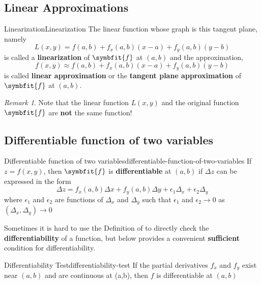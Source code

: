 \documentclass[math,code]{amznotes}
\theoremstyle{remark}
\newtheorem*{remark}{Remark}
\begin{document}
\subsection{Linear Approximations}
\begin{dfnbox}{Linearization}{Linearization}
    The linear function whose graph is this tangent plane, namely
    \begin{displaymath}
        L(x,y)=f(a,b)+f_x(a,b)(x-a)+f_y(a,b)(y-b)
    \end{displaymath}
    is called a {\color{red} \textbf{linearization}} of $\symbfit{f}$ at $(a,b)$ and the approximation,
    \begin{displaymath}
        f(x,y) \approx f(a,b)+f_x(a,b)(x-a)+f_y(a,b)(y-b)
    \end{displaymath}
    is called {\color{red} \textbf{linear approximation}} or the {\color{red} \textbf{tangent plane approximation}} of $\symbfit{f}$ at $(a,b)$.
\end{dfnbox}
\begin{notebox}
    \begin{remark}
        Note that the linear function $L(x,y)$ and the original function $\symbfit{f}$ are {\color{red} \textbf{not}} the same function!
    \end{remark}
\end{notebox}
\subsection{Differentiable function of two variables}
\begin{dfnbox}{Differentiable function of two variables}{differentiable-function-of-two-variables}
    If $z=f(x,y)$, then $\symbfit{f}$ is {\color{red} \textbf{differentiable}} at $(a,b)$ if $\Delta z$ can be expressed in the form
    \begin{displaymath}
        \Delta z = f_x(a,b)\Delta x+f_y(a,b)\Delta y + \epsilon_1\Delta_x + \epsilon_2\Delta_y
    \end{displaymath}
    where $\epsilon_1$ and $\epsilon_2$ are functions of $\Delta_x$ and $\Delta_y$ such that $\epsilon_1$ and $\epsilon_2 \to 0$ as $(\Delta_x,\Delta_y) \to 0$
\end{dfnbox}
Sometimes it is hard to use the Definition of  to directly check the {\color{red} \textbf{differentiability}} of a function, but below provides a convenient {\color{red} \textbf{sufficient}} condition for differentiability.
\begin{thmbox}{Differentiability Test}{differentiability-test}
    If the partial derivatives $f_x$ and $f_y$ exist near $(a,b)$ and are continuous at (a,b), then $f$ is differentiable at $(a,b)$
\end{thmbox}
\end{document}

